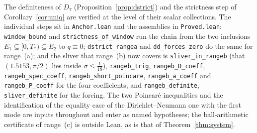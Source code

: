\documentclass[11pt]{article}
\theoremstyle{definition}
\begin{document}
The definiteness of $D_\tau$ (Proposition~\ref{prop:dstrict}) and the strictness step of
Corollary~\ref{cor:uniq} are verified at the level of their scalar collections. The
individual steps sit in \verb|Anchor.lean| and the assemblies in \verb|Proved.lean|:
\verb|window_bound| and \verb|strictness_of_window| run the chain from the two inclusions
$E_1\subseteq[0,T_\ast)\subseteq E_2$ to $q\equiv0$; \verb|dstrict_rangea| and
\verb|dd_forces_zero| do the same for range~(a); and the sliver that range~(b) now covers is
\verb|sliver_in_rangeb| (that $(1.5153,\pi/2)$ lies inside $\sigma\le\tfrac1{18}$),
\verb|rangeb_trig|, \verb|rangeb_D_coeff|, \verb|rangeb_spec_coeff|,
\verb|rangeb_short_poincare|, \verb|rangeb_a_coeff| and \verb|rangeb_P_coeff| for the four
coefficients, and \verb|rangeb_definite|, \verb|sliver_definite| for the forcing. The two
Poincar\'e inequalities and the identification of the equality case of the
Dirichlet--Neumann one with the first mode are inputs throughout and enter as named
hypotheses; the ball-arithmetic certificate of range~(c) is outside Lean, as is that of
Theorem~\ref{thm:system}.
\end{document}
